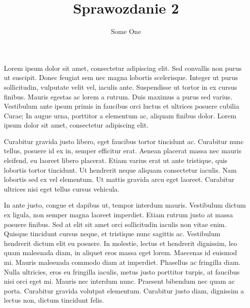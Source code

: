 \documentclass{article}
\title{Sprawozdanie 2}
\author{Some One}
\begin{document}
    \makelogotitle
    Lorem ipsum dolor sit amet, consectetur adipiscing elit. Sed convallis non purus ut suscipit. 
    Donec feugiat sem nec magna lobortis scelerisque. Integer ut purus sollicitudin, vulputate velit vel, 
    iaculis ante. Suspendisse ut tortor in ex cursus finibus. Mauris egestas ac lorem a rutrum. 
    Duis maximus a purus sed varius. Vestibulum ante ipsum primis in faucibus orci luctus et ultrices 
    posuere cubilia Curae; In augue urna, porttitor a elementum ac, aliquam finibus dolor. 
    Lorem ipsum dolor sit amet, consectetur adipiscing elit.

    Curabitur gravida justo libero, eget faucibus tortor tincidunt ac. Curabitur nunc tellus, 
    posuere id ex in, semper efficitur erat. Aenean placerat massa nec mauris eleifend, eu laoreet 
    libero placerat. Etiam varius erat ut ante tristique, quis lobortis tortor tincidunt. 
    Ut hendrerit neque aliquam consectetur iaculis. Nam lobortis sed ex vel elementum. Ut mattis gravida 
    arcu eget laoreet. Curabitur ultrices nisi eget tellus cursus vehicula.

    In ante justo, congue et dapibus ut, tempor interdum mauris. Vestibulum dictum ex ligula, 
    non semper magna laoreet imperdiet. Etiam rutrum justo at massa posuere finibus. Sed at elit 
    sit amet orci sollicitudin iaculis non vitae enim. Quisque tincidunt cursus neque, et tristique 
    nunc sagittis ac. Vestibulum hendrerit dictum elit eu posuere. In molestie, lectus et hendrerit dignissim, 
    leo quam malesuada diam, in aliquet eros massa eget lorem. Maecenas id euismod mi. Mauris malesuada commodo 
    diam at imperdiet. Phasellus ac fringilla diam. Nulla ultricies, eros eu fringilla iaculis, 
    metus justo porttitor turpis, at faucibus nisi orci eget mi. Mauris nec interdum nunc. 
    Praesent bibendum nec quam ac porta. Curabitur gravida volutpat elementum. Curabitur justo diam, 
    dignissim a lectus non, dictum tincidunt felis.

    
    \newpage


\end{document}
